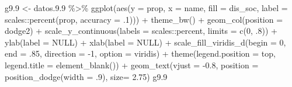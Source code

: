 \documentclass[
  12pt,
]{book}
\newenvironment{Shaded}{\begin{snugshade}}{\end{snugshade}}
\newcommand{\AttributeTok}[1]{\textcolor[rgb]{0.77,0.63,0.00}{#1}}
\newcommand{\ConstantTok}[1]{\textcolor[rgb]{0.00,0.00,0.00}{#1}}
\newcommand{\DecValTok}[1]{\textcolor[rgb]{0.00,0.00,0.81}{#1}}
\newcommand{\FloatTok}[1]{\textcolor[rgb]{0.00,0.00,0.81}{#1}}
\newcommand{\FunctionTok}[1]{\textcolor[rgb]{0.00,0.00,0.00}{#1}}
\newcommand{\NormalTok}[1]{#1}
\newcommand{\OtherTok}[1]{\textcolor[rgb]{0.56,0.35,0.01}{#1}}
\newcommand{\SpecialCharTok}[1]{\textcolor[rgb]{0.00,0.00,0.00}{#1}}
\newcommand{\StringTok}[1]{\textcolor[rgb]{0.31,0.60,0.02}{#1}}
\begin{document}
\begin{Shaded}
\begin{Highlighting}[]
\NormalTok{g9}\FloatTok{.9} \OtherTok{\textless{}{-}}\NormalTok{ datos.}\FloatTok{9.9} \SpecialCharTok{\%\textgreater{}\%} 
  \FunctionTok{ggplot}\NormalTok{(}\FunctionTok{aes}\NormalTok{(}\AttributeTok{y =}\NormalTok{ prop, }\AttributeTok{x =}\NormalTok{ name, }\AttributeTok{fill =}\NormalTok{ dis\_soc, }
             \AttributeTok{label =}\NormalTok{ scales}\SpecialCharTok{::}\FunctionTok{percent}\NormalTok{(prop, }\AttributeTok{accuracy =}\NormalTok{ .}\DecValTok{1}\NormalTok{))) }\SpecialCharTok{+} 
  \FunctionTok{theme\_bw}\NormalTok{() }\SpecialCharTok{+} 
  \FunctionTok{geom\_col}\NormalTok{(}\AttributeTok{position =} \StringTok{\textquotesingle{}dodge2\textquotesingle{}}\NormalTok{) }\SpecialCharTok{+}
  \FunctionTok{scale\_y\_continuous}\NormalTok{(}\AttributeTok{labels =}\NormalTok{ scales}\SpecialCharTok{::}\NormalTok{percent,}
                     \AttributeTok{limits =} \FunctionTok{c}\NormalTok{(}\DecValTok{0}\NormalTok{, .}\DecValTok{8}\NormalTok{)) }\SpecialCharTok{+}
  \FunctionTok{ylab}\NormalTok{(}\AttributeTok{label =} \ConstantTok{NULL}\NormalTok{) }\SpecialCharTok{+}
  \FunctionTok{xlab}\NormalTok{(}\AttributeTok{label =} \ConstantTok{NULL}\NormalTok{) }\SpecialCharTok{+}
  \FunctionTok{scale\_fill\_viridis\_d}\NormalTok{(}\AttributeTok{begin =} \DecValTok{0}\NormalTok{, }\AttributeTok{end =}\NormalTok{ .}\DecValTok{85}\NormalTok{, }\AttributeTok{direction =} \SpecialCharTok{{-}}\DecValTok{1}\NormalTok{, }\AttributeTok{option =} \StringTok{\textquotesingle{}viridis\textquotesingle{}}\NormalTok{) }\SpecialCharTok{+}
  \FunctionTok{theme}\NormalTok{(}\AttributeTok{legend.position =} \StringTok{\textquotesingle{}top\textquotesingle{}}\NormalTok{,}
        \AttributeTok{legend.title =} \FunctionTok{element\_blank}\NormalTok{()) }\SpecialCharTok{+}
  \FunctionTok{geom\_text}\NormalTok{(}\AttributeTok{vjust =} \SpecialCharTok{{-}}\FloatTok{0.8}\NormalTok{,}
            \AttributeTok{position =} \FunctionTok{position\_dodge}\NormalTok{(}\AttributeTok{width =}\NormalTok{ .}\DecValTok{9}\NormalTok{),}
            \AttributeTok{size=} \FloatTok{2.75}\NormalTok{)}
\NormalTok{g9}\FloatTok{.9}
\end{Highlighting}
\end{Shaded}
\end{document}
